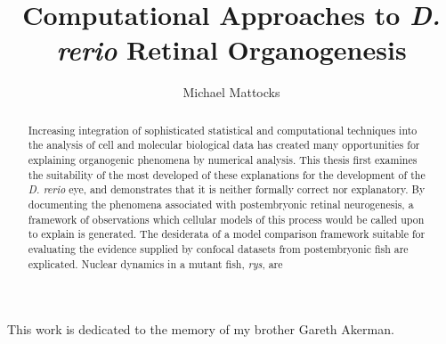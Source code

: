 \documentclass{ut-thesis}
\author{Michael Mattocks}
\title{Computational Approaches to \textit{D. rerio} Retinal Organogenesis}
\begin{document}
\begin{preliminary}

\maketitle


\begin{abstract}
Increasing integration of sophisticated statistical and computational techniques into the analysis of cell and molecular biological data has created many opportunities for explaining organogenic phenomena by numerical analysis. This thesis first examines the suitability of the most developed of these explanations for the development of the \textit{D. rerio} eye, and demonstrates that it is neither formally correct nor explanatory. By documenting the phenomena associated with postembryonic retinal neurogenesis, a framework of observations which cellular models of this process would be called upon to explain is generated. The desiderata of a model comparison framework suitable for evaluating the evidence supplied by confocal datasets from postembryonic fish are explicated. Nuclear dynamics in a mutant fish, \textit{rys}, are 
\end{abstract}


\begin{dedication}
This work is dedicated to the memory of my brother Gareth Akerman.
\end{dedication}


\end{preliminary}
\end{document}
